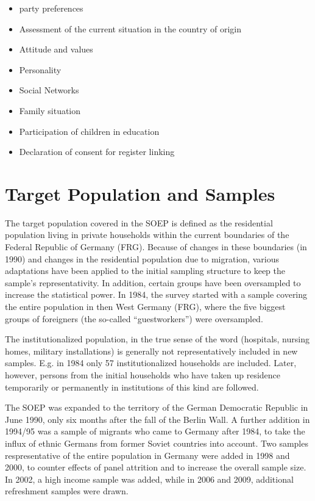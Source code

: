 \documentclass[letterpaper,10pt,openany,onesideH,english]{sphinxmanual}
\begin{document}
\begin{itemize}
\item {} 
party preferences

\item {} 
Assessment of the current situation in the country of origin

\item {} 
Attitude and values

\item {} 
Personality

\item {} 
Social Networks

\item {} 
Family situation

\item {} 
Participation of children in education

\item {} 
Declaration of consent for register linking

\end{itemize}


\chapter{Target Population and Samples}
\label{\detokenize{Target Population and Samples/index:target-population-and-samples}}\label{\detokenize{Target Population and Samples/index::doc}}
The target population covered in the SOEP is defined as the residential population living in private households within the current boundaries of the Federal Republic of Germany (FRG). Because of changes in these boundaries (in 1990) and changes in the residential population due to migration, various adaptations have been applied to the initial sampling structure to keep the sample’s representativity. In addition, certain groups have been oversampled to increase the statistical power.
In 1984, the survey started with a sample covering the entire population in then West Germany (FRG), where the five biggest groups of foreigners (the so-called “guestworkers”) were oversampled.

The institutionalized population, in the true sense of the word (hospitals, nursing homes, military installations) is generally not representatively included in new samples. E.g. in 1984 only 57 institutionalized households are included. Later, however, persons from the initial households who have taken up residence temporarily or permanently in institutions of this kind are followed.

The SOEP was expanded to the territory of the German Democratic Republic in June 1990, only six months after the fall of the Berlin Wall. A further addition in 1994/95 was a sample of migrants who came to Germany after 1984, to take the influx of ethnic Germans from former Soviet countries into account. Two samples respresentative of the entire population in Germany were added in 1998 and 2000, to counter effects of panel attrition and to increase the overall sample size. In 2002, a high income sample was added, while in 2006 and 2009, additional refreshment samples were drawn.
\end{document}
